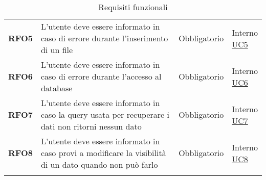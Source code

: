\begin{longtable}[H]{| >{\raggedright\bfseries}m{20mm} | >{\raggedright}m{90mm} | >{\centering}m{25mm} | >{\centering\arraybackslash}m{30mm}|}
    RFO5
     & L'utente deve essere informato in caso di errore durante l'inserimento di un file
     & Obbligatorio
     & \makecell{ Interno                                                                                                \\  \hyperref[sub:uc5]{UC5} }\\

    RFO6
     & L'utente deve essere informato in caso di errore durante l'accesso al database
     & Obbligatorio
     & \makecell{ Interno                                                                                                \\  \hyperref[sub:uc6]{UC6} }\\

    RFO7
     & L'utente deve essere informato in caso la query usata per recuperare i dati non ritorni nessun dato
     & Obbligatorio
     & \makecell{ Interno                                                                                                \\  \hyperref[sub:uc7]{UC7} }\\

    RFO8
     & L'utente deve essere informato in caso provi a modificare la visibilità di un dato quando non può farlo
     & Obbligatorio
     & \makecell{ Interno                                                                                                \\  \hyperref[sub:uc8]{UC8} }\\
    \hline
    \rowcolor{white}
    \caption{Requisiti funzionali}%
    \label{tab:requisiti_funzionali}
\end{longtable}
